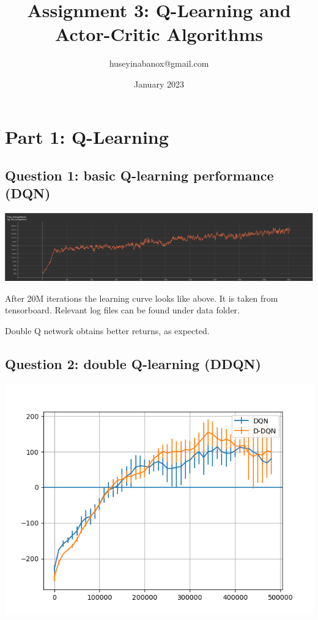 \documentclass[11pt]{article}
\title{Assignment 3: Q-Learning and Actor-Critic Algorithms}
\author{huseyinabanox@gmail.com}
\date{January 2023}
\begin{document}
    \maketitle

    \section{Part 1: Q-Learning}

    \subsection*{Question 1: basic Q-learning performance (DQN)}

    \includegraphics[scale=0.8]{q1/packman-20M}

    After 20M iterations the learning curve looks like above.
    It is taken from tensorboard.
    Relevant log files can be found under data folder.

    Double Q network obtains better returns, as expected.

    \subsection*{Question 2: double Q-learning (DDQN)}

    \includegraphics[scale=0.8]{q2/q2}
\end{document}
